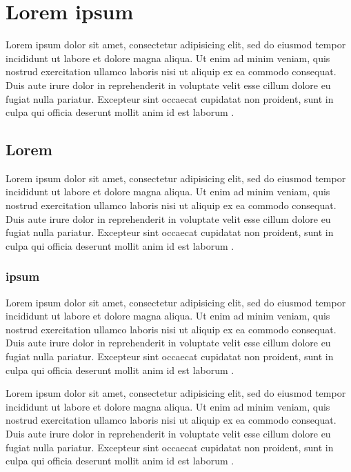 
\chapter{Lorem ipsum}

Lorem ipsum dolor sit amet, consectetur adipisicing elit, sed do eiusmod tempor incididunt ut
labore et dolore magna aliqua. Ut enim ad minim veniam, quis nostrud exercitation ullamco
laboris nisi ut aliquip ex ea commodo consequat. Duis aute irure dolor in reprehenderit in
voluptate velit esse cillum dolore eu fugiat nulla pariatur. Excepteur sint occaecat cupidatat
non proident, sunt in culpa qui officia deserunt mollit anim id est laborum \cite{freeman2004}.

\section{Lorem}

Lorem ipsum dolor sit amet, consectetur adipisicing elit, sed do eiusmod tempor incididunt ut
labore et dolore magna aliqua. Ut enim ad minim veniam, quis nostrud exercitation ullamco
laboris nisi ut aliquip ex ea commodo consequat. Duis aute irure dolor in reprehenderit in
voluptate velit esse cillum dolore eu fugiat nulla pariatur. Excepteur sint occaecat cupidatat
non proident, sunt in culpa qui officia deserunt mollit anim id est laborum \cite{freeman2004}.

\subsection{ipsum}

Lorem ipsum dolor sit amet, consectetur adipisicing elit, sed do eiusmod tempor incididunt ut
labore et dolore magna aliqua. Ut enim ad minim veniam, quis nostrud exercitation ullamco
laboris nisi ut aliquip ex ea commodo consequat. Duis aute irure dolor in reprehenderit in
voluptate velit esse cillum dolore eu fugiat nulla pariatur. Excepteur sint occaecat cupidatat
non proident, sunt in culpa qui officia deserunt mollit anim id est laborum \cite{freeman2004}.

Lorem ipsum dolor sit amet, consectetur adipisicing elit, sed do eiusmod tempor incididunt ut
labore et dolore magna aliqua. Ut enim ad minim veniam, quis nostrud exercitation ullamco
laboris nisi ut aliquip ex ea commodo consequat. Duis aute irure dolor in reprehenderit in
voluptate velit esse cillum dolore eu fugiat nulla pariatur. Excepteur sint occaecat cupidatat
non proident, sunt in culpa qui officia deserunt mollit anim id est laborum \cite{freeman2004}.

